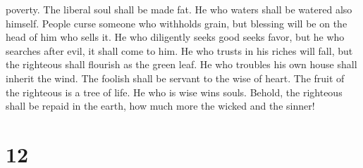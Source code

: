 poverty.  The liberal soul shall be made fat. He who
waters shall be watered also himself.  People curse
someone who withholds grain, but blessing will be on the head of him who
sells it.  He who diligently seeks good seeks favor, but
he who searches after evil, it shall come to him.  He who
trusts in his riches will fall, but the righteous shall flourish as the
green leaf.  He who troubles his own house shall inherit
the wind. The foolish shall be servant to the wise of heart.
 The fruit of the righteous is a tree of life. He who is
wise wins souls.  Behold, the righteous shall be repaid
in the earth, how much more the wicked and the sinner!

\hypertarget{section-11}{%
\section{12}\label{section-11}}

